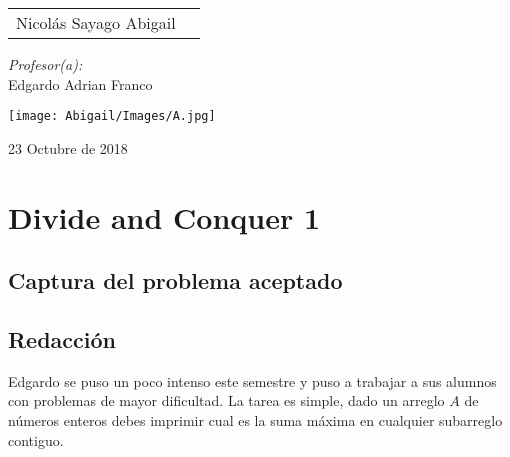 \documentclass[12pt]{article}
\begin{document}
\begin{titlepage}
\begin{center}
\begin{minipage}{0.5\textwidth}
\begin{flushleft}
                        \begin{tabular}{ll}
                         Nicolás Sayago Abigail\\
                    \end{tabular}
                    \end{flushleft}
                \end{minipage}%
                \begin{minipage}{0.5\textwidth}
                    \begin{flushright} \large
                        \emph{Profesor(a):} \\
                        Edgardo Adrian Franco  \\
                    \end{flushright}
                \end{minipage}
                \vfill
                \begin{minipage}{0.5\textwidth}
                    \begin{center} \large
                        \texttt{[image: Abigail/Images/A.jpg]}
                    \end{center}
                \end{minipage}
                    
                {\large 23 Octubre de 2018}
            \end{center}
        \end{titlepage}
    \tableofcontents
  \newpage

  \section{Divide and Conquer 1}

    \subsection{Captura del problema aceptado}

    \subsection{Redacción}
      Edgardo se puso un poco intenso este semestre y puso a trabajar a sus alumnos con problemas de mayor dificultad.
      La tarea es simple, dado un arreglo $A$ de  números enteros debes imprimir cual es la suma máxima en cualquier subarreglo contiguo.
\end{document}
